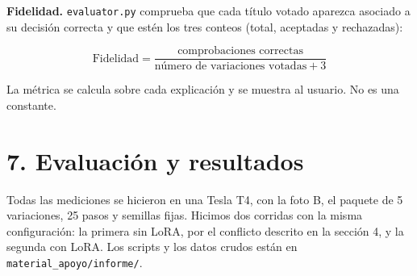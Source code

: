 \documentclass[conference]{IEEEtran}
\begin{document}
\textbf{Fidelidad.} \texttt{evaluator.py} comprueba que cada título votado aparezca asociado a su decisión correcta y que estén los tres conteos (total, aceptadas y rechazadas):

\[
\text{Fidelidad} = \frac{\text{comprobaciones correctas}}{\text{número de variaciones votadas} + 3}
\]

La métrica se calcula sobre cada explicación y se muestra al usuario. No es una constante.

\section*{7. Evaluación y resultados}

Todas las mediciones se hicieron en una Tesla T4, con la foto B, el paquete de 5 variaciones, 25 pasos y semillas fijas. Hicimos dos corridas con la misma configuración: la primera sin LoRA, por el conflicto descrito en la sección 4, y la segunda con LoRA. Los scripts y los datos crudos están en \texttt{material\_apoyo/informe/}.

\begin{table}[htbp]
\centering
\caption{Comparación de métricas entre configuraciones del motor generativo.}
\label{tab:metricas}
\footnotesize
\renewcommand{\arraystretch}{1.25}
\end{table}
\end{document}
